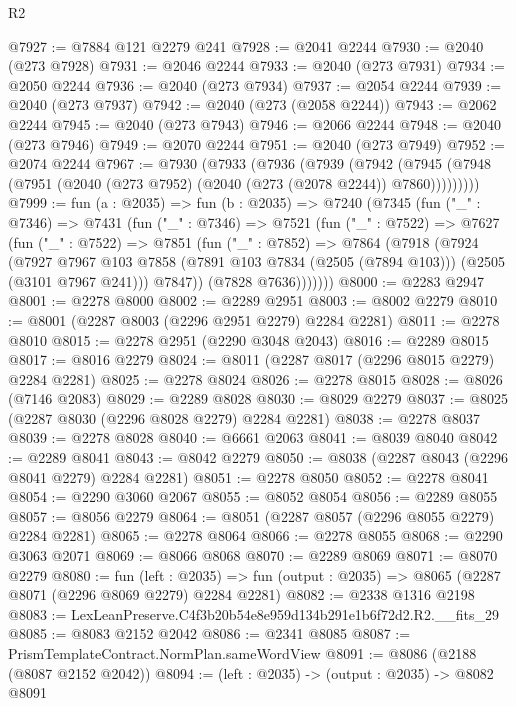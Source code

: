 \begin{lexlean}{R2}
\begin{coremodule}
@7927 := @7884 @121 @2279 @241
@7928 := @2041 @2244
@7930 := @2040 (@273 @7928)
@7931 := @2046 @2244
@7933 := @2040 (@273 @7931)
@7934 := @2050 @2244
@7936 := @2040 (@273 @7934)
@7937 := @2054 @2244
@7939 := @2040 (@273 @7937)
@7942 := @2040 (@273 (@2058 @2244))
@7943 := @2062 @2244
@7945 := @2040 (@273 @7943)
@7946 := @2066 @2244
@7948 := @2040 (@273 @7946)
@7949 := @2070 @2244
@7951 := @2040 (@273 @7949)
@7952 := @2074 @2244
@7967 := @7930
    (@7933
      (@7936
        (@7939
          (@7942 (@7945 (@7948 (@7951 (@2040 (@273 @7952) (@2040 (@273 (@2078 @2244)) @7860)))))))))
@7999 := fun (a : @2035) =>
  fun (b : @2035) =>
  @7240
    (@7345
      (fun ("_" : @7346) =>
      @7431
        (fun ("_" : @7346) =>
        @7521
          (fun ("_" : @7522) =>
          @7627
            (fun ("_" : @7522) =>
            @7851
              (fun ("_" : @7852) =>
              @7864
                (@7918
                  (@7924
                    (@7927
                      @7967
                      @103
                      @7858
                      (@7891 @103 @7834 (@2505 (@7894 @103)))
                      (@2505 (@3101 @7967 @241)))
                    @7847))
                (@7828 @7636)))))))
@8000 := @2283 @2947
@8001 := @2278 @8000
@8002 := @2289 @2951
@8003 := @8002 @2279
@8010 := @8001 (@2287 @8003 (@2296 @2951 @2279) @2284 @2281)
@8011 := @2278 @8010
@8015 := @2278 @2951 (@2290 @3048 @2043)
@8016 := @2289 @8015
@8017 := @8016 @2279
@8024 := @8011 (@2287 @8017 (@2296 @8015 @2279) @2284 @2281)
@8025 := @2278 @8024
@8026 := @2278 @8015
@8028 := @8026 (@7146 @2083)
@8029 := @2289 @8028
@8030 := @8029 @2279
@8037 := @8025 (@2287 @8030 (@2296 @8028 @2279) @2284 @2281)
@8038 := @2278 @8037
@8039 := @2278 @8028
@8040 := @6661 @2063
@8041 := @8039 @8040
@8042 := @2289 @8041
@8043 := @8042 @2279
@8050 := @8038 (@2287 @8043 (@2296 @8041 @2279) @2284 @2281)
@8051 := @2278 @8050
@8052 := @2278 @8041
@8054 := @2290 @3060 @2067
@8055 := @8052 @8054
@8056 := @2289 @8055
@8057 := @8056 @2279
@8064 := @8051 (@2287 @8057 (@2296 @8055 @2279) @2284 @2281)
@8065 := @2278 @8064
@8066 := @2278 @8055
@8068 := @2290 @3063 @2071
@8069 := @8066 @8068
@8070 := @2289 @8069
@8071 := @8070 @2279
@8080 := fun (left : @2035) =>
  fun (output : @2035) => @8065 (@2287 @8071 (@2296 @8069 @2279) @2284 @2281)
@8082 := @2338 @1316 @2198
@8083 := LexLeanPreserve.C4f3b20b54e8e959d134b291e1b6f72d2.R2.__fits_29
@8085 := @8083 @2152 @2042
@8086 := @2341 @8085
@8087 := PrismTemplateContract.NormPlan.sameWordView
@8091 := @8086 (@2188 (@8087 @2152 @2042))
@8094 := (left : @2035) -> (output : @2035) -> @8082 @8091

\end{coremodule}
\end{lexlean}
